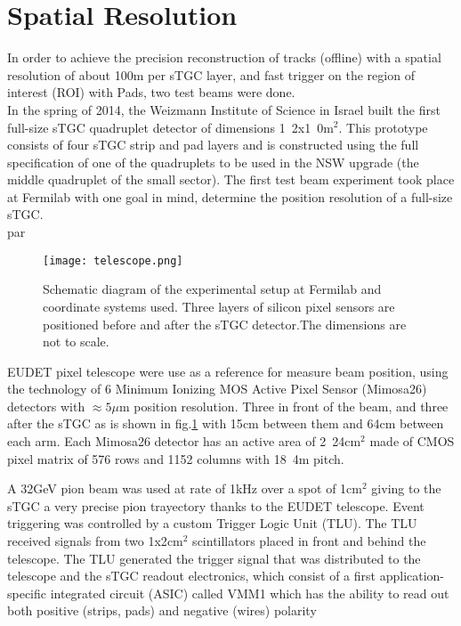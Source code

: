 \section{Spatial Resolution}
In order to achieve the precision reconstruction of tracks (offline) with a spatial resolution of about
\unit{100}{\micro m} per sTGC layer, and fast trigger on the region of interest (ROI) with Pads, two test beams were done.\\
In the spring of 2014, the Weizmann Institute of Science in Israel built the first full-size sTGC quadruplet detector of
dimensions \unit{1.2x1.0}{m$^2$}. This prototype consists of four sTGC strip and pad layers and is constructed using the full
specification of one of the quadruplets to be used in the NSW upgrade (the middle quadruplet of the small sector).
The first test beam experiment took place at Fermilab with one goal in mind, determine the position resolution of a
full-size sTGC.\\par
\begin{figure}[!ht]
	\centering
	\texttt{[image: telescope.png]}
	\caption{\small Schematic diagram of the experimental setup at Fermilab and coordinate systems used. Three layers of silicon pixel sensors are positioned before and after the sTGC detector.The dimensions are not to scale.}\label{fig:telescope}
\end{figure}
EUDET pixel telescope were use as a reference for measure beam position, using the technology of 6 Minimum Ionizing MOS
Active Pixel Sensor (Mimosa26) detectors with $\approx 5 \mu$m position resolution. Three in front of the beam, and three
after the sTGC as is shown in fig.\ref{fig:telescope} with \unit{15}{cm} between them and \unit{64}{cm} between each arm.
Each Mimosa26 detector has an active area of \unit{2.24}{cm$^2$} made of CMOS pixel
matrix of 576 rows and 1152 columns with \unit{18.4}{\micro m} pitch.\par
A \unit{32}{GeV} pion beam was used at rate of \unit{1}{kHz} over a spot of \unit{1}{cm$^2$} giving to the sTGC a very
precise pion trayectory thanks to the EUDET telescope.
Event triggering was controlled by a custom Trigger Logic Unit (TLU). The TLU received signals from two
\unit{1x2}{cm$^2$}
scintillators placed in front and behind the telescope. The TLU generated the trigger signal that was distributed to the
telescope and the sTGC readout electronics, which consist of a first application-specific integrated circuit (ASIC)
called VMM1 which has the ability to read out both positive (strips, pads) and negative (wires) polarity
